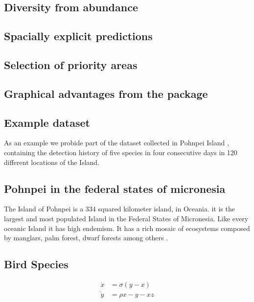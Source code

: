 \documentclass[article]{jss}
\begin{document}
\subsection{Diversity from abundance}\label{diversity-from-abundance}

\subsection{Spacially explicit
predictions}\label{spacially-explicit-predictions}

\subsection{Selection of priority
areas}\label{selection-of-priority-areas}

\subsection{Graphical advantages from the
package}\label{graphical-advantages-from-the-package}

\subsection{Example dataset}\label{example-dataset}

As an example we probide part of the dataset collected in Pohnpei Island
\citep{oleiro2014avian}, containing the detection history of five
species in four consecutive days in 120 different locations of the
Island.

\subsection{Pohnpei in the federal states of
micronesia}\label{pohnpei-in-the-federal-states-of-micronesia}

The Island of Pohnpei is a 334 squared kilometer island, in Oceania. it
is the largest and most populated Island in the Federal States of
Micronesia. Like every oceanic Island it has high endemism. It has a
rich mosaic of ecosystems composed by manglars, palm forest, dwarf
forests among others
\citep{raynor1994resource, buden2000comparison, merlin2005kava}.

\subsection{Bird Species}\label{bird-species}

\[
\begin{aligned}
  \dot{x} & = \sigma(y-x) \\
  \dot{y} & = \rho x- y - xz 
\end{aligned}
\]
\end{document}
